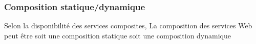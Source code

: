 



    
      \subsubsection{Composition statique/dynamique}
      \label{sec:comp-stat}
      Selon la disponibilité des services composites, La composition
      des services Web peut être soit une composition statique soit
      une composition dynamique

